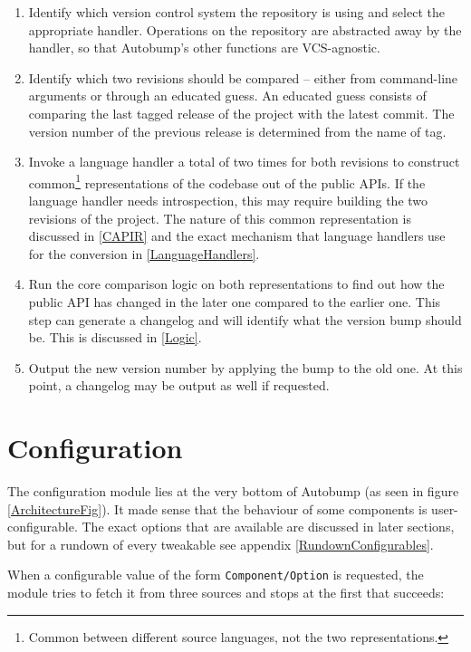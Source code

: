 \documentclass{l4proj}
\newcommand\genericstyle{\lstset{basicstyle=\ttm}}
\newcommand\codeinline[1]{{\genericstyle\lstinline!#1!}}
\begin{document}
\begin{enumerate}
\item Identify which version control system the repository is using
and select the appropriate handler. Operations on the repository are
abstracted away by the handler, so that Autobump's other functions are
VCS-agnostic.
\item Identify which two revisions should be compared -- either from
command-line arguments or through an educated guess. An educated guess
consists of comparing the last tagged release of the project with the
latest commit. The version number of the previous release is
determined from the name of tag.
\item Invoke a language handler a total of two times for both
revisions to construct common\footnote{Common between different
source languages, not the two representations.} representations of the
codebase out of the public APIs. If the language handler needs
introspection, this may require building the two revisions of the project.
The nature of this common representation is discussed in \ref{CAPIR}
and the exact mechanism that language handlers use for the conversion
in \ref{LanguageHandlers}.
\item Run the core comparison logic on both representations to find
out how the public API has changed in the later one compared to the
earlier one. This step can generate a changelog and will identify what
the version bump should be. This is discussed in \ref{Logic}.
\item Output the new version number by applying the bump to the old
one. At this point, a changelog may be output as well if requested.
\end{enumerate}

\section{Configuration}

The configuration module lies at the very bottom of Autobump (as seen
in figure \ref{ArchitectureFig}). It made sense that the behaviour of
some components is user-configurable. The exact options that are
available are discussed in later sections, but for a rundown of every
tweakable see appendix \ref{RundownConfigurables}.

When a configurable value of the form \codeinline{Component/Option} is
requested, the module tries to fetch it from three sources and stops
at the first that succeeds:
\end{document}
